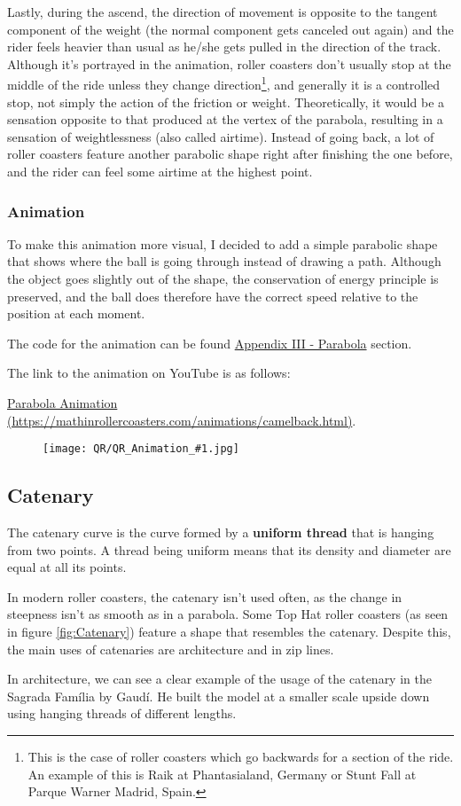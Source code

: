 \documentclass[12pt,twoside,a4paper]{article}
\newcommand{\link}[1]{https://mathinrollercoasters.com/animations/#1.html}
\newcommand{\LinkToAnimation}[2]{
\noindent The code for the animation can be found \hyperref[sec:Appendix III_#1]{Appendix III - #1} section.

\noindent The link to the animation on YouTube is as follows:
	
\noindent \href{\link{#2}}{#1 Animation (\link{#2})}.
	
\begin{figure}[H]
	\centering
	\texttt{[image: QR/QR\_Animation\_\#1.jpg]}
\end{figure}
}
\begin{document}
	Lastly, during the ascend, the direction of movement is opposite to the tangent component of the weight (the normal component gets canceled out again) and the rider feels heavier than usual as he/she gets pulled in the direction of the track. Although it's portrayed in the animation, roller coasters don't usually stop at the middle of the ride unless they change direction\footnote{This is the case of roller coasters which go backwards for a section of the ride. An example of this is Raik at Phantasialand, Germany or Stunt Fall at Parque Warner Madrid, Spain.}, and generally it is a controlled stop, not simply the action of the friction or weight. Theoretically, it would be a sensation opposite to that produced at the vertex of the parabola, resulting in a sensation of weightlessness (also called airtime). Instead of going back, a lot of roller coasters feature another parabolic shape right after finishing the one before, and the rider can feel some airtime at the highest point.
	
	\subsubsection{Animation}
	To make this animation more visual, I decided to add a simple parabolic shape that shows where the ball is going through instead of drawing a path. Although the object goes slightly out of the shape, the conservation of energy principle is preserved, and the ball does therefore have the correct speed relative to the position at each moment.
	
	\LinkToAnimation{Parabola}{camelback}
	
	\cleardoublepage
	
	\subsection{Catenary}
	The catenary curve is the curve formed by a \textbf{uniform thread} that is hanging from two points. A thread being uniform means that its density and diameter are equal at all its points.
	
	In modern roller coasters, the catenary isn't used often, as the change in steepness isn't as smooth as in a parabola. Some Top Hat roller coasters (as seen in figure \ref{fig:Catenary}) feature a shape that resembles the catenary. Despite this, the main uses of catenaries are architecture and in zip lines.
	
	In architecture, we can see a clear example of the usage of the catenary in the Sagrada Família by Gaudí. He built the model at a smaller scale upside down using hanging threads of different lengths.
	
\end{document}
